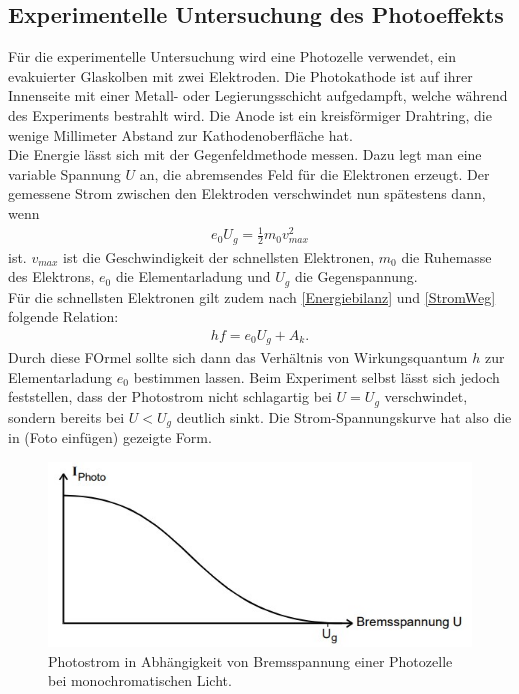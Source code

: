 \subsection{Experimentelle Untersuchung des Photoeffekts}

Für die experimentelle Untersuchung wird eine Photozelle verwendet, 
ein evakuierter Glaskolben mit zwei Elektroden. Die Photokathode ist auf
ihrer Innenseite mit einer Metall- oder Legierungsschicht aufgedampft,
welche während des Experiments bestrahlt wird. Die Anode ist ein kreisförmiger Drahtring,
die wenige Millimeter Abstand zur Kathodenoberfläche hat.\\
Die Energie lässt sich mit der Gegenfeldmethode messen. Dazu legt man 
eine variable Spannung $U$ an, die abremsendes Feld für die Elektronen erzeugt.
Der gemessene Strom zwischen den Elektroden verschwindet nun spätestens dann,
wenn 
\begin{align}
    \label{eqn:StromWeg}
    e_0 U_g = \frac{1}{2} m_0 v^2_{max}
\end{align}
ist. $v_{max}$ ist die Geschwindigkeit der schnellsten Elektronen, $m_0$ die Ruhemasse
des Elektrons, $e_0$ die Elementarladung und $U_g$ die Gegenspannung.\\
Für die schnellsten Elektronen gilt zudem nach \autoref{Energiebilanz} und 
\autoref{StromWeg} folgende Relation:
\begin{align}
    \label{eqn:1und2}
    hf = e_0 U_g + A_k.
\end{align}
Durch diese FOrmel sollte sich dann das Verhältnis von Wirkungsquantum $h$ zur
Elementarladung $e_0$ bestimmen lassen. Beim Experiment selbst lässt sich jedoch 
feststellen, dass der Photostrom nicht schlagartig bei $U = U_g$ verschwindet, sondern 
bereits bei $U < U_g$ deutlich sinkt. Die Strom-Spannungskurve hat also
die in (Foto einfügen) gezeigte Form.\\
\begin{figure}
        \centering
        \includegraphics{Bilder/PhotoStrom1.jpg}
        \caption{Photostrom in Abhängigkeit von Bremsspannung einer Photozelle bei monochromatischen Licht.\cite{sample}}
        \label{fig:Reflexion}
\end{figure}
